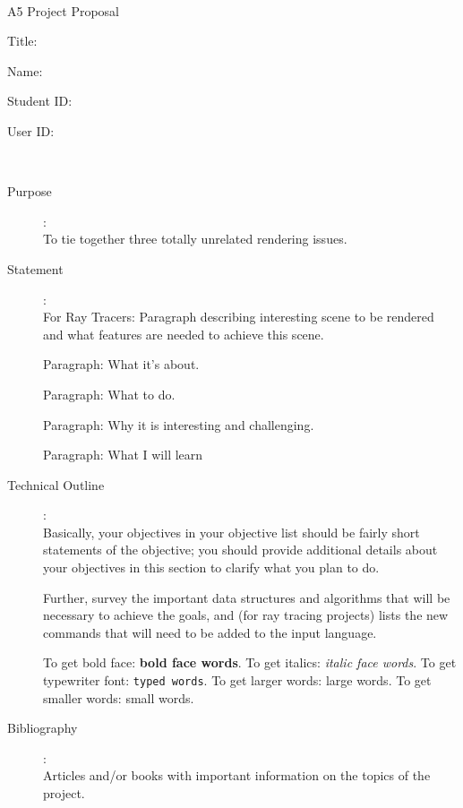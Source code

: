 \documentclass {article}
\begin{document}
~\vfill
\begin{center}
\Large

A5 Project Proposal

Title:

Name: 

Student ID:

User ID:
\end{center}
\vfill ~\vfill~
\newpage
{}
\begin{description}
\item[Purpose]:\\
	To tie together three totally unrelated rendering issues.

\item[Statement]:\\
	For Ray Tracers: Paragraph describing interesting scene to be
		rendered and what features are needed to achieve
		this scene.

	Paragraph: What it's about.

	Paragraph: What to do.

	Paragraph: Why it is interesting and challenging.

	Paragraph: What I will learn

\item[Technical Outline]:\\
    Basically, your objectives in your objective list should be fairly
    short statements of the objective; you should provide additional
    details about your objectives in this section to clarify what you
    plan to do.

     Further, survey the important data structures and algorithms that
     will be necessary to achieve the goals, and (for ray tracing
     projects) lists the new commands
     that will need to be added to the input language.

     To  get  bold face: {\bf bold face words}.  To get italics: {\it italic
     face words}.  To  get typewriter font: {\tt typed words}.  To get
     larger  words:  {\large large  words}.   To  get smaller words: 
     {\small small words}.  

\item[Bibliography]:\\
     Articles  and/or  books  with  important  information on the
     topics of the project.

\end{description}
\newpage


\end{document}
